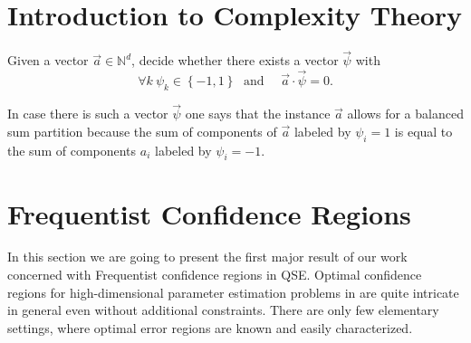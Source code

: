 















\section{Introduction to Complexity Theory}
\label{sec:intro.complexity}


\begin{problem}\label{prob:ellpos.balanced_sum}
  Given a vector $\vec a \in \mathbb{N}^d$, decide whether there exists a vector $\vec \psi$ with
  \[
    \forall{k}\:\psi_{k}\in\left\{ -1,1\right\} \;\textrm{ and }\quad \vec a \cdot \vec\psi=0.
    \label{eq:ellpos.partition_vector}
  \]
\end{problem}
In case there is such a vector $\vec \psi$ one says that the instance $\vec a$ allows for a balanced sum partition because the sum of components of $\vec a$ labeled by $\psi_i = 1$ is equal to the sum of components $a_i$ labeled by $\psi_i = -1$.




















\section{Frequentist Confidence Regions}
\label{sec:error.frequentist}

In this section we are going to present the first major result of our work~\cite{Suess_2016_Error} concerned with Frequentist confidence regions in QSE.
Optimal confidence regions for high-dimensional parameter estimation problems in are quite intricate in general even without additional constraints.
There are only few elementary settings, where optimal error regions are known and easily characterized.

